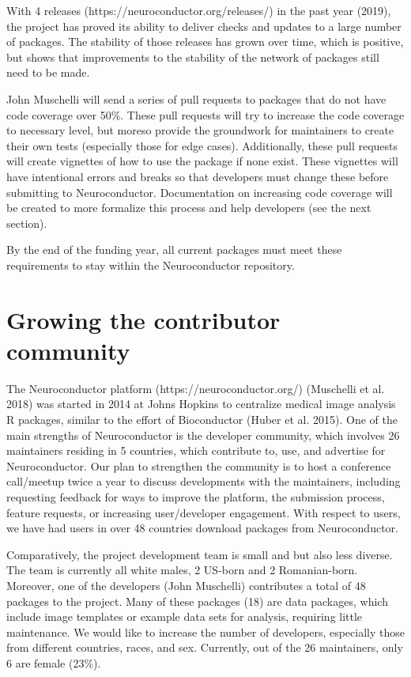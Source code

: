 \documentclass[]{elsarticle} %
\begin{document}
With 4 releases (https://neuroconductor.org/releases/) in the past year (2019), the project has proved its ability to deliver checks and updates to a large number of packages. The stability of those releases has grown over time, which is positive, but shows that improvements to the stability of the network of packages still need to be made.

John Muschelli will send a series of pull requests to packages that do not have code coverage over 50\%. These pull requests will try to increase the code coverage to necessary level, but moreso provide the groundwork for maintainers to create their own tests (especially those for edge cases). Additionally, these pull requests will create vignettes of how to use the package if none exist. These vignettes will have intentional errors and breaks so that developers must change these before submitting to Neuroconductor. Documentation on increasing code coverage will be created to more formalize this process and help developers (see the next section).

By the end of the funding year, all current packages must meet these requirements to stay within the Neuroconductor repository.

\hypertarget{growing-the-contributor-community}{%
\section{Growing the contributor community}\label{growing-the-contributor-community}}

The Neuroconductor platform (https://neuroconductor.org/) (Muschelli et al. 2018) was started in 2014 at Johns Hopkins to centralize medical image analysis R packages, similar to the effort of Bioconductor (Huber et al. 2015). One of the main strengths of Neuroconductor is the developer community, which involves 26 maintainers residing in 5 countries, which contribute to, use, and advertise for Neuroconductor. Our plan to strengthen the community is to host a conference call/meetup twice a year to discuss developments with the maintainers, including requesting feedback for ways to improve the platform, the submission process, feature requests, or increasing user/developer engagement. With respect to users, we have had users in over 48 countries download packages from Neuroconductor.

Comparatively, the project development team is small and but also less diverse. The team is currently all white males, 2 US-born and 2 Romanian-born. Moreover, one of the developers (John Muschelli) contributes a total of 48 packages to the project. Many of these packages (18) are data packages, which include image templates or example data sets for analysis, requiring little maintenance. We would like to increase the number of developers, especially those from different countries, races, and sex. Currently, out of the 26 maintainers, only 6 are female (23\%).
\end{document}
